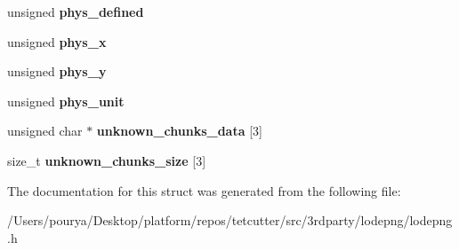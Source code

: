 \begin{DoxyCompactItemize}
\item 
\hypertarget{structLodePNGInfo_a9b8e29b7e7b4908a2de0275e01a828ed}{}unsigned {\bfseries phys\+\_\+defined}\label{structLodePNGInfo_a9b8e29b7e7b4908a2de0275e01a828ed}

\item 
\hypertarget{structLodePNGInfo_a1593fa6e1acc93f3b9de51c340bef94d}{}unsigned {\bfseries phys\+\_\+x}\label{structLodePNGInfo_a1593fa6e1acc93f3b9de51c340bef94d}

\item 
\hypertarget{structLodePNGInfo_a52ad7a105244d00f1e91c489eaf53f97}{}unsigned {\bfseries phys\+\_\+y}\label{structLodePNGInfo_a52ad7a105244d00f1e91c489eaf53f97}

\item 
\hypertarget{structLodePNGInfo_ad6f2171d9f87716e5010f6c5352f9855}{}unsigned {\bfseries phys\+\_\+unit}\label{structLodePNGInfo_ad6f2171d9f87716e5010f6c5352f9855}

\item 
\hypertarget{structLodePNGInfo_a8347476da7fc2fc6af4ec7ed44b638c6}{}unsigned char $\ast$ {\bfseries unknown\+\_\+chunks\+\_\+data} \mbox{[}3\mbox{]}\label{structLodePNGInfo_a8347476da7fc2fc6af4ec7ed44b638c6}

\item 
\hypertarget{structLodePNGInfo_a25a81d760759bd0383ae5a81ba83911d}{}size\+\_\+t {\bfseries unknown\+\_\+chunks\+\_\+size} \mbox{[}3\mbox{]}\label{structLodePNGInfo_a25a81d760759bd0383ae5a81ba83911d}

\end{DoxyCompactItemize}


The documentation for this struct was generated from the following file\+:\begin{DoxyCompactItemize}
\item 
/\+Users/pourya/\+Desktop/platform/repos/tetcutter/src/3rdparty/lodepng/lodepng.\+h\end{DoxyCompactItemize}

